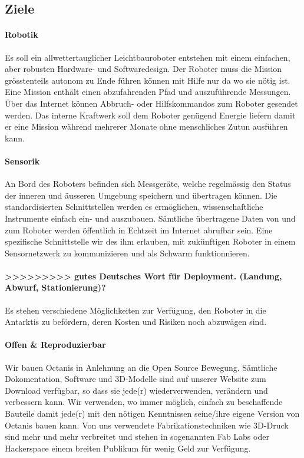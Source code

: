 \documentclass[a4paper,12pt]{article}
\begin{document}
\subsection{Ziele}

\paragraph{Robotik}
Es soll ein allwettertauglicher Leichtbauroboter entstehen mit einem einfachen, aber robusten Hardware- und Softwaredesign. Der Roboter muss die Mission grösstenteils autonom zu Ende führen können mit Hilfe nur da wo sie nötig ist. Eine Mission enthält einen abzufahrenden Pfad und auszuführende Messungen. Über das Internet können Abbruch- oder Hilfskommandos zum Roboter gesendet werden. Das interne Kraftwerk soll dem Roboter genügend Energie liefern damit er eine Mission während mehrerer Monate ohne menschliches Zutun ausführen kann.

\paragraph{Sensorik}
An Bord des Roboters befinden sich Messgeräte, welche regelmässig den Status der inneren und äusseren Umgebung speichern und übertragen können. Die standardisierten Schnittstellen werden es ermöglichen, wissenschaftliche Instrumente einfach ein- und auszubauen. Sämtliche übertragene Daten von und zum Roboter werden öffentlich in Echtzeit im Internet abrufbar sein. Eine spezifische Schnittstelle wir des ihm erlauben, mit zukünftigen Roboter in einem Sensornetzwerk zu kommunizieren und als Schwarm funktionnieren.

\paragraph{>>>>>>>>> gutes Deutsches Wort für Deployment. (Landung, Abwurf, Stationierung)?}
Es stehen verschiedene Möglichkeiten zur Verfügung, den Roboter in die Antarktis zu befördern, deren Kosten und Risiken noch abzuwägen sind.



\paragraph{Offen \& Reproduzierbar} 
Wir bauen Octanis in Anlehnung an die Open Source Bewegung. Sämtliche Dokomentation, Software und 3D-Modelle sind auf unserer Website zum Download verfügbar, so dass sie jede(r) wiederverwenden, verändern und verbessern kann. Wir verwenden, wo immer möglich, einfach zu beschaffende Bauteile damit jede(r) mit den nötigen Kenntnissen seine/ihre eigene Version von Octanis bauen kann. Von uns verwendete Fabrikationstechniken wie 3D-Druck sind mehr und mehr verbreitet und stehen in sogenannten Fab Labs \cite{fablab} oder Hackerspace \cite{hackerspace} einem breiten Publikum für wenig Geld zur Verfügung.
 
\end{document}
